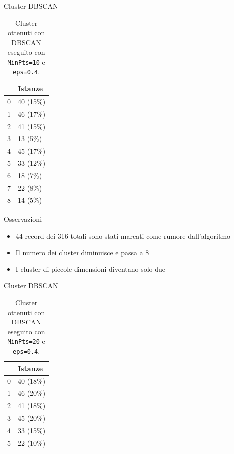 \documentclass{beamer}
\begin{document}
\begin{frame}{Cluster DBSCAN}
  \begin{table}[H]
    \centering
    \begin{tabular}{@{}ll@{}}
    \toprule
                            & Istanze    \\ \midrule
    \multicolumn{1}{l}{0}   & 40 (15\%)  \\ 
    \multicolumn{1}{l}{1}   & 46 (17\%)  \\ 
    \multicolumn{1}{l}{2}   & 41 (15\%)  \\ 
    \multicolumn{1}{l}{3}   & 13 (5\%)   \\ 
    \multicolumn{1}{l}{4}   & 45 (17\%)  \\ 
    \multicolumn{1}{l}{5}   & 33 (12\%)  \\ 
    \multicolumn{1}{l}{6}   & 18 (7\%)   \\ 
    \multicolumn{1}{l}{7}   & 22 (8\%)   \\ 
    \multicolumn{1}{l}{8}   & 14 (5\%)   \\ \bottomrule
    \end{tabular}
    \caption{Cluster ottenuti con DBSCAN eseguito con \texttt{MinPts=10} e \texttt{eps=0.4}.}
    \end{table}
\end{frame}

\begin{frame}{Osservazioni}
  \begin{itemize}
    \item 44 record dei 316 totali sono stati marcati come rumore dall’algoritmo
    \item Il numero dei cluster diminuisce e passa a 8
    \item I cluster di piccole dimensioni diventano solo due
  \end{itemize}
\end{frame}

\begin{frame}{Cluster DBSCAN}
  \begin{table}[H]
    \centering
    \begin{tabular}{@{}ll@{}}
    \toprule
                            & Istanze  \\ \midrule
    \multicolumn{1}{l}{0} & 40 (18\%) \\
    \multicolumn{1}{l}{1} & 46 (20\%) \\
    \multicolumn{1}{l}{2} & 41 (18\%) \\
    \multicolumn{1}{l}{3} & 45 (20\%) \\
    \multicolumn{1}{l}{4} & 33 (15\%) \\
    \multicolumn{1}{l}{5} & 22 (10\%) \\ \bottomrule
    \end{tabular}
    \caption{Cluster ottenuti con DBSCAN eseguito con \texttt{MinPts=20} e \texttt{eps=0.4}.}
    \end{table}
\end{frame}
\end{document}
